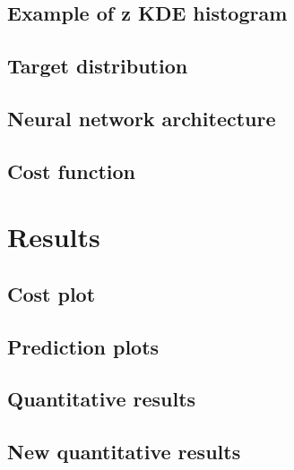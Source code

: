 \documentclass[aspectratio=169, 10pt]{beamer}
\begin{document}
\subsection{Example of z KDE histogram}


\subsection{Target distribution}


\subsection{Neural network architecture}


\subsection{Cost function}



\section{Results}

\subsection{Cost plot}


\subsection{Prediction plots}


\subsection{Quantitative results}


\subsection{New quantitative results}


\end{document}
